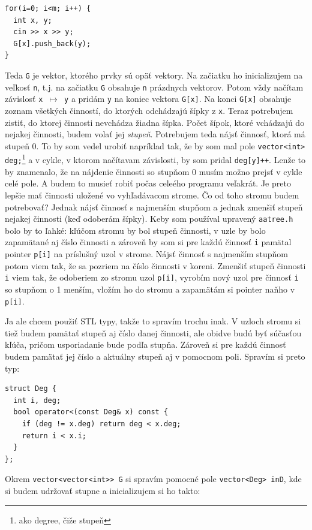 \documentclass[10pt]{article}
\def\prg{\lstinline}
\def\ods{\vspace*{10pt}}
\begin{document}
{{\begin{lstlisting}
for(i=0; i<m; i++) {
  int x, y;
  cin >> x >> y;
  G[x].push_back(y);
}
\end{lstlisting}
}
Teda {\tt G} je vektor, ktorého prvky sú opäť vektory. Na začiatku ho inicializujem na veľkosť
{\tt n}, t.j. na začiatku {\tt G} obsahuje {\tt n} prázdnych vektorov. Potom vždy načítam
závislosť {\tt x $\mapsto$ y} a pridám {\tt y} na koniec vektora \prg!G[x]!. Na konci
\prg!G[x]! obsahuje zoznam všetkých činností, do ktorých odchádzajú šípky z {\tt x}.
Teraz potrebujem zistiť, do ktorej činnosti nevchádza žiadna šípka. Počet šípok, ktoré
vchádzajú do nejakej činnosti, budem volať jej {\em stupeň}. Potrebujem teda nájsť činnosť,
ktorá má stupeň 0. To by som vedel urobiť napríklad tak, že by som mal pole
\prg!vector<int> deg;!\footnote{ako degree, čiže stupeň} a v cykle, v ktorom načítavam
závislosti, by som pridal \prg!deg[y]++!. Lenže to by znamenalo, že na nájdenie 
činnosti so stupňom 0 musím možno prejsť v cykle celé pole. A budem to musieť robiť
počas celeého programu veľakrát. Je preto lepšie mať činnosti uložené vo vyhľadávacom strome. 
Čo od toho stromu budem potrebovať? Jednak nájsť činnosť s najmenším stupňom
a jednak zmenšiť stupeň nejakej činnosti (keď odoberám šípky). Keby som používal 
upravený {\tt aatree.h} bolo by to ľahké: kľúčom stromu by bol stupeň činnosti, v uzle
by bolo zapamätané aj číslo činnosti a
zároveň by som si pre každú činnosť {\tt i} pamätal pointer {\tt p[i]}
na príslušný uzol v strome. 
Nájsť činnosť s najmenším stupňom potom viem tak, že sa pozriem na číslo činnosti v koreni.
Zmenšiť stupeň činnosti {\tt i} viem tak, že odoberiem zo stromu uzol 
{\tt p[i]}, vyrobím nový
uzol pre činnosť {\tt i} so stupňom o 1 menším, vložím ho do stromu a zapamätám si
pointer naňho v {\tt p[i]}.

\ods
Ja ale chcem použiť STL typy, takže to spravím trochu inak.
V uzloch stromu si
tiež budem  pamätať stupeň aj číslo danej činnosti, ale obidve budú
byť súčasťou kľúča, pričom usporiadanie bude podľa stupňa. Zároveň si pre každú
činnosť budem pamätať jej číslo a aktuálny stupeň aj v pomocnom poli.
Spravím si preto typ:

\begin{lstlisting}
struct Deg {
  int i, deg;
  bool operator<(const Deg& x) const {
    if (deg != x.deg) return deg < x.deg;
    return i < x.i;
  }
};
\end{lstlisting}

Okrem \prg!vector<vector<int>> G! si spravím pomocné pole \prg!vector<Deg> inD!, 
kde si budem udržovať stupne
a inicializujem si ho takto:

}
\end{document}
